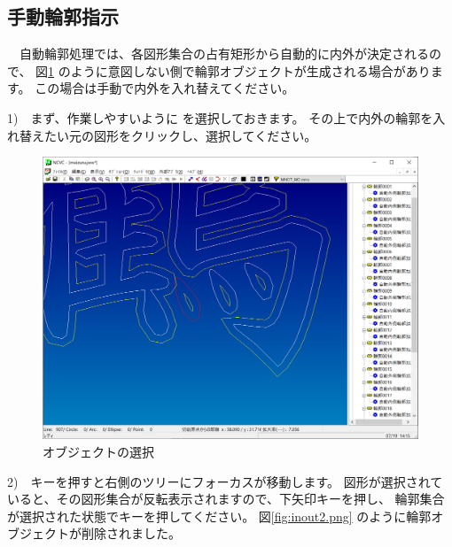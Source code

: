 

\subsection{手動輪郭指示}
　自動輪郭処理では、各図形集合の占有矩形から自動的に内外が決定されるので、
図\ref{fig:inout1.png} のように意図しない側で輪郭オブジェクトが生成される場合があります。
この場合は手動で内外を入れ替えてください。

1)　まず、作業しやすいように
 を選択しておきます。
その上で内外の輪郭を入れ替えたい元の図形をクリックし、選択してください。

\begin{figure}[H]
\centering
\includegraphics[scale=0.55]{No3/fig/inout1.png}
\caption{オブジェクトの選択}
\label{fig:inout1.png}
\end{figure}

2)　キーを押すと右側のツリーにフォーカスが移動します。
図形が選択されていると、その図形集合が反転表示されますので、下矢印キーを押し、
輪郭集合が選択された状態でキーを押してください。
図\ref{fig:inout2.png} のように輪郭オブジェクトが削除されました。

